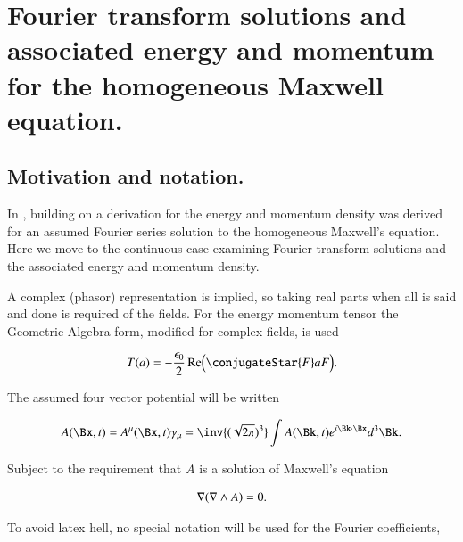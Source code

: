 %

\chapter{Fourier transform solutions and associated energy and momentum for the homogeneous Maxwell equation.}
\label{chap:ftMaxVacuum}
\date{Dec 21, 2009}

\beginArtNoToc

\section{Motivation and notation.}

In , building on \cite{complexFieldEnergy} a derivation for the energy and momentum density was derived for an assumed Fourier series solution to the homogeneous Maxwell's equation.  Here we move to the continuous case examining Fourier transform solutions and the associated energy and momentum density.

A complex (phasor) representation is implied, so taking real parts when all is said and done is required of the fields.  For the energy momentum tensor the Geometric Algebra form, modified for complex fields, is used

\begin{align}
\label{eqn:ftMaxVacuum:1}
T(a) = -\frac{\epsilon_0}{2} \Real \Bigl( \conjugateStar{F} a F \Bigr).
\end{align}

The assumed four vector potential will be written

\begin{align}
\label{eqn:ftMaxVacuum:2}
A(\Bx, t) = A^\mu(\Bx, t) \gamma_\mu = \inv{(\sqrt{2 \pi})^3} \int A(\Bk, t) e^{i \Bk \cdot \Bx } d^3 \Bk.
\end{align}

Subject to the requirement that $A$ is a solution of Maxwell's equation

\begin{align}
\label{eqn:ftMaxVacuum:3}
\nabla (\nabla \wedge A) = 0.
\end{align}

To avoid latex hell, no special notation will be used for the Fourier coefficients,

